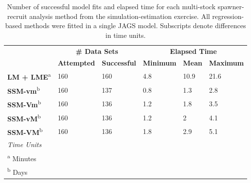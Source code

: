 \documentclass[12pt,]{book}
\theoremstyle{definition}
\theoremstyle{definition}
\theoremstyle{definition}
\theoremstyle{remark}
\begin{document}
\clearpage

\begin{table}

\caption{\label{tab:model-run-time-table}Number of successful model fits and elapsed time for each multi-stock spawner-recruit analysis method from the simulation-estimation exercise. All regression-based methods were fitted in a single JAGS model. Subscripts denote differences in time units.}
\centering
\begin{tabular}[t]{llllll}
\toprule
\multicolumn{1}{c}{\bfseries } & \multicolumn{2}{c}{\bfseries \# Data Sets} & \multicolumn{3}{c}{\bfseries Elapsed Time} \\
\cmidrule(l{2pt}r{2pt}){2-3} \cmidrule(l{2pt}r{2pt}){4-6}
\textbf{} & \textbf{Attempted} & \textbf{Successful} & \textbf{Minimum} & \textbf{Mean} & \textbf{Maximum}\\
\midrule
\textbf{LM + LME}\textsuperscript{a} & 160 & 160 & 4.8 & 10.9 & 21.6\\
\textbf{SSM-vm}\textsuperscript{b} & 160 & 137 & 0.8 & 1.3 & 2.8\\
\textbf{SSM-Vm}\textsuperscript{b} & 160 & 136 & 1.2 & 1.8 & 3.5\\
\textbf{SSM-vM}\textsuperscript{b} & 160 & 136 & 1.2 & 2 & 4.1\\
\textbf{SSM-VM}\textsuperscript{b} & 160 & 136 & 1.8 & 2.9 & 5.1\\
\bottomrule
\multicolumn{6}{l}{\textit{Time Units}}\\
\multicolumn{6}{l}{\textsuperscript{a} Minutes}\\
\multicolumn{6}{l}{\textsuperscript{b} Days}\\
\end{tabular}
\end{table}

\clearpage
\end{document}
